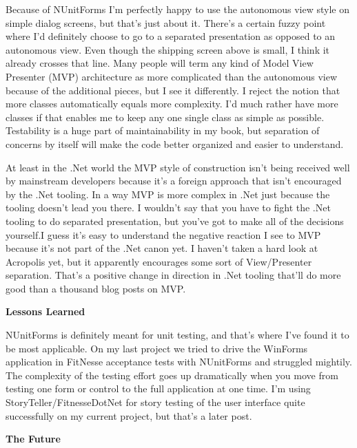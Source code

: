 \documentclass{article}
\begin{document}
{Because of NUnitForms I'm perfectly happy to use the autonomous view style on simple dialog screens, but that's just about it.  There's a certain fuzzy point where I'd definitely choose to go to a separated presentation as opposed to an autonomous view.  Even though the shipping screen above is small, I think it already crosses that line.  Many people will term any kind of Model View Presenter (MVP) architecture as more complicated than the autonomous view because of the additional pieces, but I see it differently.  I reject the notion that more classes automatically equals more complexity.  I'd much rather have more classes if that enables me to keep any one single class as simple as possible.  Testability is a huge part of maintainability in my book, but separation of concerns by itself will make the code better organized and easier to understand.

At least in the .Net world the MVP style of construction isn't being received well by mainstream developers because it's a foreign approach that isn't encouraged by the .Net tooling.  In a way MVP is more complex in .Net just because the tooling doesn't lead you there.  I wouldn't say that you have to fight the .Net tooling to do separated presentation, but you've got to make all of the decisions yourself.I guess it's easy to understand the negative reaction I see to MVP because it's not part of the .Net canon yet.  I haven't taken a hard look at Acropolis yet, but it apparently encourages some sort of View/Presenter separation.  That's a positive change in direction in .Net tooling that'll do more good than a thousand blog posts on MVP.

 
\Large {\textbf{Lessons Learned}}

NUnitForms is definitely meant for unit testing, and that's where I've found it to be most applicable.  On my last project we tried to drive the WinForms application in FitNesse acceptance tests with NUnitForms and struggled mightily.  The complexity of the testing effort goes up dramatically when you move from testing one form or control to the full application at one time.  I'm using StoryTeller/FitnesseDotNet for story testing of the user interface quite successfully on my current project, but that's a later post.
 
\Large {\textbf{The Future}}

}
\end{document}
